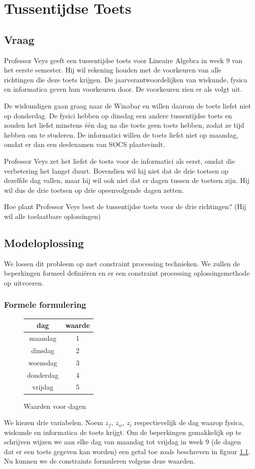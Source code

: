 \documentclass[alternative-exam.tex]{subfiles}
\begin{document}
\chapter{Tussentijdse Toets}

\section{Vraag}
Professor Veys geeft een tussentijdse toets voor Lineaire Algebra in week 9 van het eerste semester.
Hij wil rekening houden met de voorkeuren van alle richtingen die deze toets krijgen. De jaarverantwoordelijken van wiskunde, fysica en informatica geven hun voorkeuren door. De voorkeuren zien er als volgt uit.

De wiskundigen gaan graag naar de Winabar en willen daarom de toets liefst niet op donderdag. De fysici hebben op dinsdag een andere tussentijdse toets en zouden het liefst minstens \'e\'en dag na die toets geen toets hebben, zodat ze tijd hebben om te studeren. De informatici willen de toets liefst niet op maandag, omdat er dan een deelexamen van SOCS plaatsvindt.

Professor Veys zet het liefst de toets voor de informatici als eerst, omdat die verbetering het langst duurt. Bovendien wil hij niet dat de drie toetsen op dezelfde dag vallen, maar hij wil ook niet dat er dagen tussen de toetsen zijn. Hij wil dus de drie toetsen op drie opeenvolgende dagen zetten.

Hoe plant Professor Veys best de tussentijdse toets voor de drie richtingen? (Hij wil alle toelaatbare oplossingen)

\section{Modeloplossing}
We lossen dit probleem op met constraint processing technieken. We zullen de beperkingen formeel defini\"eren en er een constraint processing oplossingsmethode op uitvoeren.
\subsection{Formele formulering}
\begin{figure}[H]
\centering
\caption{Waarden voor dagen}
\label{waarde_dagen}
\begin{tabular}{| c | c | }
\hline
dag & waarde\\
\hline
maandag & 1\\
dinsdag & 2\\
woensdag & 3\\
donderdag & 4\\
vrijdag & 5\\
\hline
\end{tabular}
\end{figure}
We kiezen drie variabelen. Noem $z_f$, $z_w$, $z_i$ respectievelijk de dag waarop fysica, wiskunde en informatica de toets krijgt. Om de beperkingen gemakkelijk op te schrijven wijzen we aan elke dag van maandag tot vrijdag in week 9 (de dagen dat er een toets gegeven kan worden) een getal toe zoals beschreven in figuur \ref{waarde_dagen}.
Nu kunnen we de constraints formuleren volgens deze waarden.
\end{document}
